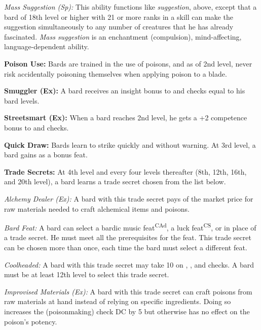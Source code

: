 \textit{Mass Suggestion (Sp):} This ability functions like \emph{suggestion}, above, except that a bard of 18th level or higher with 21 or more ranks in a  skill can make the suggestion simultaneously to any number of creatures that he has already fascinated. \emph{Mass suggestion} is an enchantment (compulsion), mind-affecting, language-dependent ability.


\textbf{Poison Use:} Bards are trained in the use of poisons, and as of 2nd level, never risk accidentally poisoning themselves when applying poison to a blade.


\textbf{Smuggler (Ex):} A bard receives an insight bonus to  and  checks equal to \onehalf his bard levels.


\textbf{Streetsmart (Ex):} When a bard reaches 2nd level, he gets a +2 competence bonus to  and  checks.


\textbf{Quick Draw:} Bards learn to strike quickly and without warning. At 3rd level, a bard gains  as a bonus feat.


\textbf{Trade Secrets:} At 4th level and every four levels thereafter (8th, 12th, 16th, and 20th level), a bard learns a trade secret chosen from the list below.

\textit{Alchemy Dealer (Ex):} A bard with this trade secret pays \onehalf of the market price for raw materials needed to craft alchemical items and poisons.

\textit{Bard Feat:} A bard can select a bardic music feat\textsuperscript{CAd}, a luck feat\textsuperscript{CS}, or  in place of a trade secret.  He must meet all the prerequisites for the feat. This trade secret can be chosen more than once, each time the bard must select a different feat.

\textit{Coolheaded:} A bard with this trade secret may take 10 on , , and  checks. A bard must be at least 12th level to select this trade secret.

\textit{Improvised Materials (Ex):} A bard with this trade secret can craft poisons from raw materials at hand instead of relying on specific ingredients. Doing so increases the  (poisonmaking) check DC by 5 but otherwise has no effect on the poison's potency.


